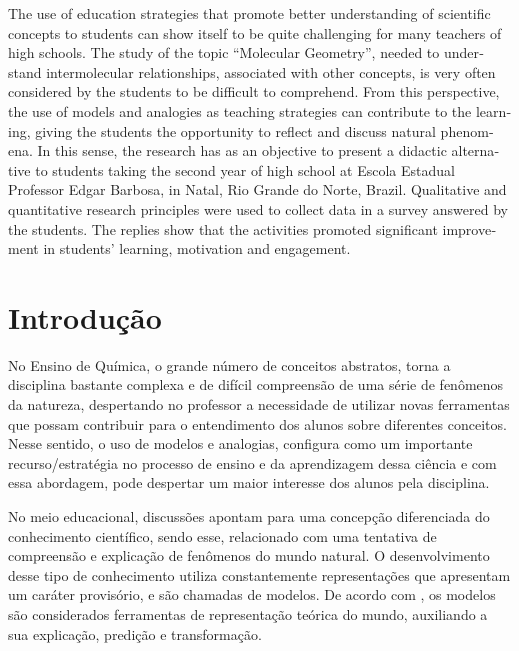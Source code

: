 \begin{refsection}
\begin{otherlanguage}{english}
    \begin{galoResumo}[Abstract]
        The use of education strategies that promote better understanding of scientific concepts to students can show itself to be quite challenging for many teachers of high schools. The study of the topic “Molecular Geometry”, needed to understand intermolecular relationships, associated with other concepts, is very often considered by the students to be difficult to comprehend. From this perspective, the use of models and analogies as teaching strategies can contribute to the learning, giving the students the opportunity to reflect and discuss natural phenomena. In this sense, the research has as an objective to present a didactic alternative to students taking the second year of high school at Escola Estadual Professor Edgar Barbosa, in Natal, Rio Grande do Norte, Brazil. Qualitative and quantitative research principles were used to collect data in a survey answered by the students. The replies show that the activities promoted significant improvement in students' learning, motivation and engagement.
    \end{galoResumo}
    
    \end{otherlanguage}

    \section{Introdução}

    No Ensino de Química, o grande número de conceitos abstratos, torna a disciplina bastante complexa e de difícil compreensão de uma série de fenômenos da natureza, despertando no professor a necessidade de utilizar novas ferramentas que possam contribuir para o entendimento dos alunos sobre diferentes conceitos. Nesse sentido, o uso de modelos e analogias, configura como um importante recurso/estratégia no processo de ensino e da aprendizagem dessa ciência e com essa abordagem, pode despertar um maior interesse dos alunos pela disciplina.  

    No meio educacional, discussões apontam para uma concepção diferenciada do conhecimento científico, sendo esse, relacionado com uma tentativa de compreensão e explicação de fenômenos do mundo natural. O desenvolvimento desse tipo de conhecimento utiliza constantemente representações que apresentam um caráter provisório, e são chamadas de modelos. De acordo com \textcite{GALAGOVSKYAndADÚRIZBRAVO2001Modelos}, os modelos são considerados ferramentas de representação teórica do mundo, auxiliando a sua explicação, predição e transformação. 


\end{refsection}
